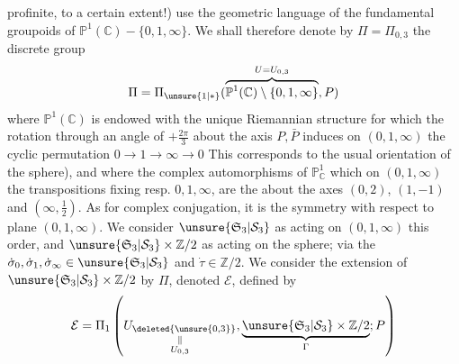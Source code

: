 profinite, to a certain extent!) use the geometric language of the fundamental groupoids of $\mathbb P^1(\mathbb C)-\{0,1,\infty\}$. We  shall therefore denote by $\Pi=\Pi_{0,3}$ the discrete group
\[
\Pi=\Pi_{\unsure{1|*}}(\overbrace{\mathbb P^1(\mathbb C)\setminus\{0,1,\infty\}}^{U=U_{0,3}},P)
\]
where $\mathbb P^1(\mathbb C)$ is endowed with the unique  Riemannian  structure for which the rotation \inserted{$\dot\rho$} through an angle of $+\frac{2\pi}{3}$ about the axis $P,\bar P$  induces on $(0,1,\infty)$ the cyclic permutation $0\longrightarrow1\longrightarrow\infty\longrightarrow0$ This corresponds to the usual orientation of the sphere), and where the complex automorphisms  of $\mathbb P^1_{\mathbb C}$ which     on $(0,1,\infty)$ the transpositions fixing resp. $0,1,\infty$, are  the   about the axes  $(0,2)$, $(1,-1)$ and $(\infty,\frac12)$.
As for complex conjugation, it is the symmetry with respect to  plane $(0,1,\infty)$. We consider $\unsure{\mathfrak S_3|\mathcal S_3}$ as acting on $(0,1,\infty)$  this order, and $\unsure{\mathfrak S_3|\mathcal S_3}\times\mathbb Z/2$ as acting on the sphere; via the $\dot\sigma_0,\dot\sigma_1,\dot\sigma_\infty\in\unsure{\mathfrak S_3|\mathcal S_3}$ and $\dot\tau\in\mathbb Z/2$. We consider the extension  of $\unsure{\mathfrak S_3|\mathcal S_3}\times\mathbb Z/2$ by $\Pi$, denoted  $\mathcal E$, defined by
\[
\mathcal E=\Pi_1\left(\underset{\substack{\Vert\\U_{0,3}}}{U_{\deleted{\unsure{0,3}}}},\underbrace{\unsure{\mathfrak S_3|\mathcal S_3}\times\mathbb Z/2}_{\Gamma};P\right)
\]
